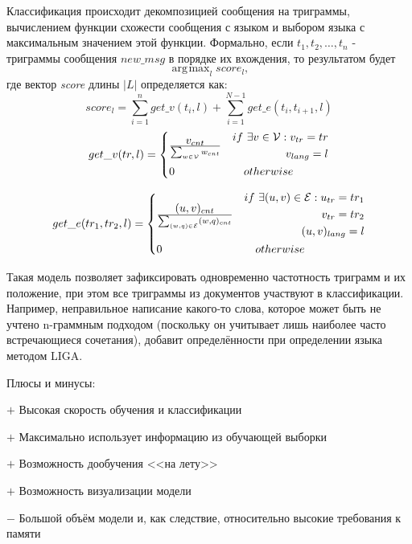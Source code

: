 \documentclass[a4paper, 14pt]{article}
\DeclareMathOperator*{\argmax}{\arg\!\max}
\begin{document}
		Классификация происходит декомпозицией сообщения на триграммы, вычислением функции схожести сообщения с языком и
		выбором языка с максимальным значением этой функции. Формально, если
		$t_{1}, t_{2}, \ldots, t_{n}$ - триграммы сообщения $new\_msg$ в порядке их вхождения, то результатом будет
		$$ \argmax_{l} score_{l} ,$$
		где вектор \textit{score} длины $|L|$ определяется как:
		$$ score_{l} = \sum_{i=1}^{n} get\_v(t_{i}, l) + \sum_{i=1}^{N-1} get\_e(t_{i}, t_{i+1}, l)$$
		\[
 		get\_v(tr, l) =
 		  \begin{dcases}
  		   v_{cnt} \over \sum_{w \in \mathcal{V}} w_{cnt} & 
  		   \begin{split} 
					 if \ \exists v \in \mathcal{V}: v_{tr}=tr \\ v_{lang}=l	
  		   	\end{split} \\
  		   0 & \quad otherwise
  		 \end{dcases}
		\]		
		
		\[
 		get\_e(tr_1, tr_2, l) =
 		  \begin{dcases}
  		   (u, v)_{cnt} \over \sum_{(w, q) \in \mathcal{E}} (w, q)_{cnt} & 
  		    \begin{split} 
					 if \ \exists (u, v) \in \mathcal{E}:  u_{tr}=tr_1 \\ v_{tr}=tr_2 \\ (u, v)_{lang}=l
  		   	\end{split} \\
  		   0 & \quad otherwise
  		 \end{dcases}
		\]	
		
		Такая модель позволяет зафиксировать одновременно частотность триграмм и их положение, при этом все триграммы
		из документов участвуют в классификации. Например, неправильное написание какого-то слова, которое может быть не учтено n-граммным подходом (поскольку он
		учитывает лишь наиболее часто встречающиеся сочетания), добавит определённости при определении языка методом LIGA.		
		
		\noindent Плюсы и минусы:
		
		$+$ Высокая скорость обучения и классификации
		
		$+$ Максимально использует информацию из обучающей выборки
		
		$+$ Возможность дообучения <<на лету>>
		
		$+$ Возможность визуализации модели
		
		$-$ Большой объём модели и, как следствие, относительно высокие требования к памяти
			
\end{document}
